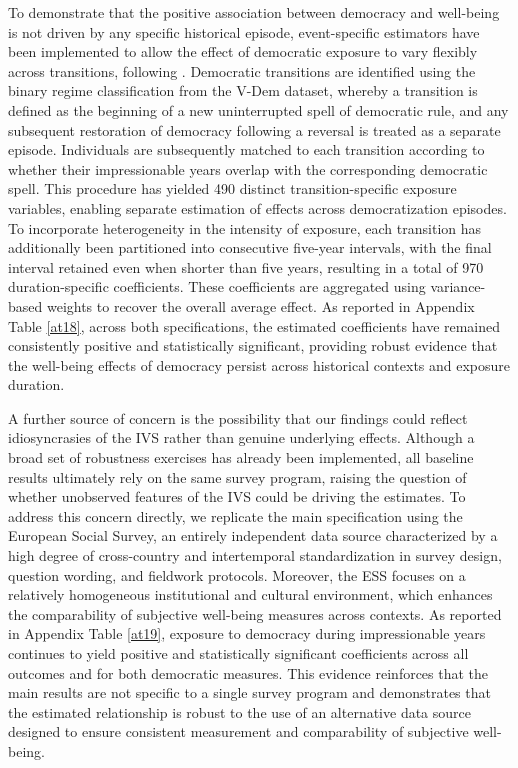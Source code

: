 \documentclass[11pt]{article}
\newcommand{\bbb}[1]{\cTwo{#1}} %
\begin{document}
To demonstrate that the positive association between democracy and well-being is not driven by any specific historical episode, event-specific estimators have been implemented to allow the effect of democratic exposure to vary flexibly across transitions, following \bbb{Wooldridge2021}. Democratic transitions are identified using the binary regime classification from the V-Dem dataset, whereby a transition is defined as the beginning of a new uninterrupted spell of democratic rule, and any subsequent restoration of democracy following a reversal is treated as a separate episode. Individuals are subsequently matched to each transition according to whether their impressionable years overlap with the corresponding democratic spell. This procedure has yielded 490 distinct transition-specific exposure variables, enabling separate estimation of effects across democratization episodes. To incorporate heterogeneity in the intensity of exposure, each transition has additionally been partitioned into consecutive five-year intervals, with the final interval retained even when shorter than five years, resulting in a total of 970 duration-specific coefficients. These coefficients are aggregated using variance-based weights to recover the overall average effect. As reported in Appendix Table \ref{at18}, across both specifications, the estimated coefficients have remained consistently positive and statistically significant, providing robust evidence that the well-being effects of democracy persist across historical contexts and exposure duration.

A further source of concern is the possibility that our findings could reflect idiosyncrasies of the IVS rather than genuine underlying effects. Although a broad set of robustness exercises has already been implemented, all baseline results ultimately rely on the same survey program, raising the question of whether unobserved features of the IVS could be driving the estimates. To address this concern directly, we replicate the main specification using the European Social Survey, an entirely independent data source characterized by a high degree of cross-country and intertemporal standardization in survey design, question wording, and fieldwork protocols. Moreover, the ESS focuses on a relatively homogeneous institutional and cultural environment, which enhances the comparability of subjective well-being measures across contexts. As reported in Appendix Table \ref{at19}, exposure to democracy during impressionable years continues to yield positive and statistically significant coefficients across all outcomes and for both democratic measures. This evidence reinforces that the main results are not specific to a single survey program and demonstrates that the estimated relationship is robust to the use of an alternative data source designed to ensure consistent measurement and comparability of subjective well-being.
\end{document}
